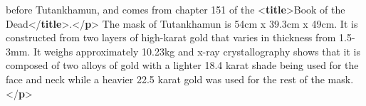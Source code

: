 \begin{shaded}
\hspace*{1em}\hspace*{1em}\hspace*{1em}\hspace*{1em}\hspace*{1em}\hspace*{1em} before Tutankhamun, and comes from chapter 151 of the {<\textbf{title}>}Book of the Dead{</\textbf{title}>}.{</\textbf{p}>}\mbox{}\newline 
\hspace*{1em}\mbox{}\newline 
\hspace*{1em}\mbox{}\newline 
\hspace*{1em}\hspace*{1em}The mask of Tutankhamun is 54cm x 39.3cm x 49cm. It is constructed from two layers of high-karat gold that\mbox{}\newline 
\hspace*{1em}\hspace*{1em}\hspace*{1em}\hspace*{1em}\hspace*{1em}\hspace*{1em} varies in thickness from 1.5-3mm. It weighs approximately 10.23kg and x-ray crystallography shows that it is\mbox{}\newline 
\hspace*{1em}\hspace*{1em}\hspace*{1em}\hspace*{1em}\hspace*{1em}\hspace*{1em} composed of two alloys of gold with a lighter 18.4 karat shade being used for the face and neck while a heavier\mbox{}\newline 
\hspace*{1em}\hspace*{1em}\hspace*{1em}\hspace*{1em}\hspace*{1em}\hspace*{1em} 22.5 karat gold was used for the rest of the mask.{</\textbf{p}>}\mbox{}\newline 

\end{shaded}
